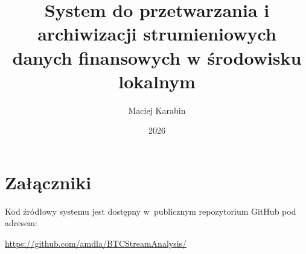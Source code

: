 \documentclass[thesis=inz,faculty=ee]{EE-dyplom}
\title{System do przetwarzania i archiwizacji strumieniowych danych finansowych w środowisku lokalnym}
\author{Maciej Karabin}
\date{2026}
\begin{document}
    \frontpages

    \setcounter{page}{1}

    
    
    
    
    
    
    
    

    \bibliografia

    \cleardoublepage


    \chapter*{Załączniki}
    \label{ch:zalacznik}

    Kod źródłowy systemu jest dostępny w~publicznym repozytorium GitHub pod adresem:

    \vspace{1em}
    \noindent\url{https://github.com/amdla/BTCStreamAnalysis/}
\end{document}

